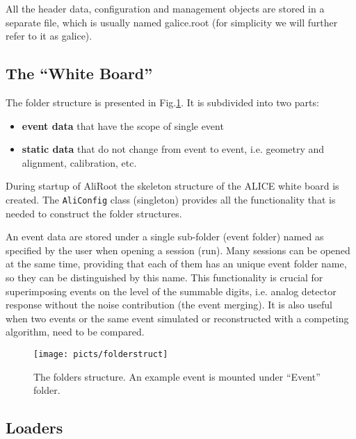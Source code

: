 \documentclass[12pt,a4paper,twoside]{article}
\begin{document}
{All the header data, configuration and management objects
are stored in a separate file, which is usually named galice.root 
(for simplicity we will further refer to it as galice).


\subsection{The ``White Board''}

The folder structure is presented in Fig.\ref{cap:soft:folderstruct}.
It is subdivided into two parts:
\begin{itemize}
\item \textbf{event data} that have the scope of single event 
\item \textbf{static data} that do not change from event to event, 
  i.e. geometry and alignment, calibration, etc.
\end{itemize}

During startup of AliRoot the skeleton structure of the ALICE white 
board is created.  The \texttt{AliConfig} class (singleton) provides all the 
functionality that is needed to construct the folder structures.

An event data are stored under a single sub-folder (event folder) named as 
specified by the user when opening a session (run). Many sessions can be 
opened at the same time, providing that each of them has an unique event 
folder name, so they can be distinguished by this name. 
This functionality is crucial for superimposing events
on the level of the summable digits, i.e. analog detector response without the noise
contribution (the event merging). It is also useful when two events
or the same event simulated or reconstructed with a competing algorithm, 
need to be compared.

\begin{figure}
  \begin{center}
    \texttt{[image: picts/folderstruct]}
  \end{center}
  \caption
  {The folders structure. An example event is mounted under ``Event'' folder.
    \label{cap:soft:folderstruct}}
\end{figure}


\subsection {Loaders}

}
\end{document}
